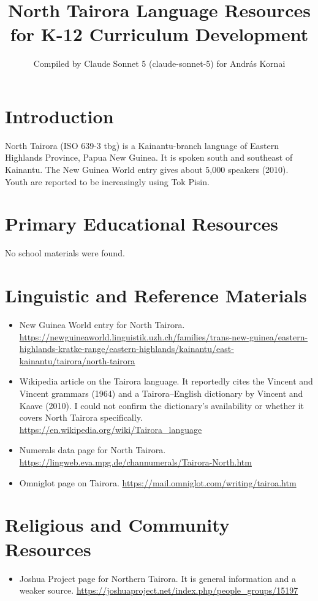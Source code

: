 \documentclass[12pt]{article}
\title{North Tairora Language Resources for K-12 Curriculum Development}
\author{Compiled by Claude Sonnet 5 (claude-sonnet-5) for Andr\'as Kornai}
\date{}
\begin{document}
\maketitle

\section{Introduction}
North Tairora (ISO 639-3 tbg) is a Kainantu-branch language of Eastern Highlands Province, Papua New Guinea. It is spoken south and southeast of Kainantu. The New Guinea World entry gives about 5,000 speakers (2010). Youth are reported to be increasingly using Tok Pisin.

\section{Primary Educational Resources}
No school materials were found.

\section{Linguistic and Reference Materials}
\begin{itemize}
\item New Guinea World entry for North Tairora. \url{https://newguineaworld.linguistik.uzh.ch/families/trans-new-guinea/eastern-highlands-kratke-range/eastern-highlands/kainantu/east-kainantu/tairora/north-tairora}
\item Wikipedia article on the Tairora language. It reportedly cites the Vincent and Vincent grammars (1964) and a Tairora--English dictionary by Vincent and Kaave (2010). I could not confirm the dictionary's availability or whether it covers North Tairora specifically. \url{https://en.wikipedia.org/wiki/Tairora_language}
\item Numerals data page for North Tairora. \url{https://lingweb.eva.mpg.de/channumerals/Tairora-North.htm}
\item Omniglot page on Tairora. \url{https://mail.omniglot.com/writing/tairoa.htm}
\end{itemize}

\section{Religious and Community Resources}
\begin{itemize}
\item Joshua Project page for Northern Tairora. It is general information and a weaker source. \url{https://joshuaproject.net/index.php/people_groups/15197}
\end{itemize}
\end{document}
